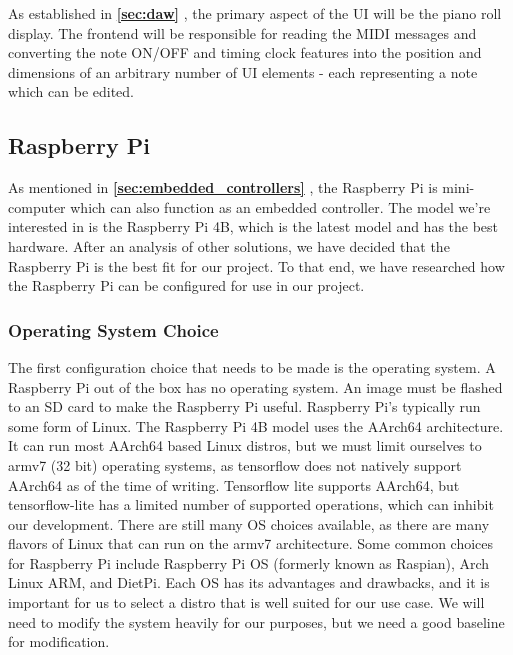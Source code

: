 As established in \textbf{\ref{sec:daw} }, the primary aspect of the UI
will be the piano roll display. The frontend will be responsible for reading the MIDI
messages and converting the note ON/OFF and timing clock features into the position and
dimensions of an arbitrary number of UI elements - each representing a note which can be
edited.

\subsection{Raspberry Pi}

As mentioned in \textbf{\ref{sec:embedded_controllers} },
the Raspberry Pi is mini-computer which can also function as an embedded controller. The
model we're interested in is the Raspberry Pi 4B, which is the latest model and has the
best hardware. After an analysis of other solutions, we have decided that the
Raspberry Pi is the best fit for our project. To that end, we have researched how the
Raspberry Pi can be configured for use in our project.

\subsubsection{Operating System Choice}

The first configuration choice that needs to be made is the operating system. A Raspberry
Pi out of the box has no operating system. An image must be flashed to an SD card to make
the Raspberry Pi useful. Raspberry Pi's typically run some form of Linux. The Raspberry Pi
4B model uses the AArch64 architecture. It can run most AArch64 based Linux distros, but
we must limit ourselves to armv7 (32 bit) operating systems, as tensorflow does not
natively support AArch64 as of the time of writing. Tensorflow lite supports AArch64, but
tensorflow-lite has a limited number of supported operations, which can inhibit our
development. There are still many OS choices available, as there are many flavors of Linux
that can run on the armv7 architecture. Some common choices for Raspberry Pi include
Raspberry Pi OS (formerly known as Raspian), Arch Linux ARM, and DietPi. Each OS has its
advantages and drawbacks, and it is important for us to select a distro that is well
suited for our use case. We will need to modify the system heavily for our purposes, but
we need a good baseline for modification.

